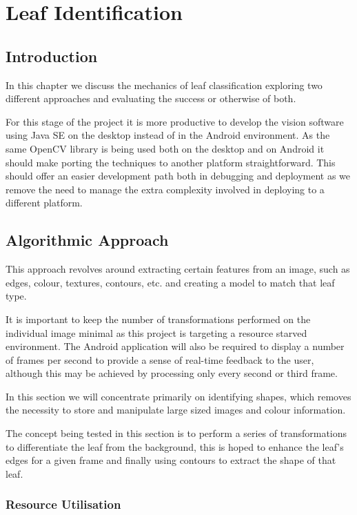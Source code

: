 \chapter{Leaf Identification}

\section{Introduction}
In this chapter we discuss the mechanics of leaf classification exploring two different approaches and evaluating the success or otherwise of both.

For this stage of the project it is more productive to develop the vision software using Java SE on the desktop instead of in the Android environment. As the same OpenCV library is being used both on the desktop and on Android it should make porting the techniques to another platform straightforward. This should offer an easier development path both in debugging and deployment as we remove the need to manage the extra complexity involved in deploying to a different platform. 


\section{Algorithmic Approach}

This approach revolves around extracting certain features from an image, such as edges, colour, textures, contours, etc. and creating a model to match that leaf type.

It is important to keep the number of transformations performed on the individual image minimal as this project is targeting a resource starved environment. The Android application will also be required to display a number of frames per second to provide a sense of real-time feedback to the user, although this may be achieved by processing only every second or third frame.

In this section we will concentrate primarily on identifying shapes, which removes the necessity to store and manipulate large sized images and colour information. 

The concept being tested in this section is to perform a series of transformations to differentiate the leaf from the background, this is hoped to enhance the leaf’s edges for a given frame and finally using contours to extract the shape of that leaf. 

\subsection{Resource Utilisation}

